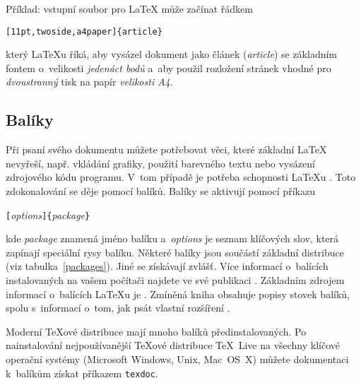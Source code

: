\begin{table}[!bp]
\begin{lined}{\textwidth}
\begin{flushleft}
\begin{description}
\end{description}
\end{flushleft}
\end{lined}
\end{table}

Příklad: vstupní soubor pro \LaTeX{} může začínat řádkem
\begin{code}
\verb|[11pt,twoside,a4paper]{article}|
\end{code}
který \LaTeX u říká, aby vysázel dokument jako článek (\emph{article})
se základním fontem o~velikosti \emph{jedenáct bodů} a~aby použil
rozložení stránek vhodné pro \emph{dvoustranný} tisk na papír
\emph{velikosti A4}.
\pagebreak[2]

\subsection{Balíky}
Při psaní svého dokumentu můžete potřebovat věci, které
základní \LaTeX{} nevyřeší, např. vkládání
grafiky, použití barevného textu nebo vysázení zdrojového kódu
programu. V~tom případě je potřeba schopnosti \LaTeX u .
Toto zdokonalování se děje
pomocí balíků. Balíky se aktivují pomocí příkazu
\begin{lscommand}
\verb|[|\emph{options}\verb|]{|\emph{package}\verb|}|
\end{lscommand}
\noindent kde \emph{package} znamená jméno balíku a~\emph{options}
je seznam klíčových slov, která zapínají speciální rysy balíku.
Některé balíky jsou součástí základní distribuce \LaTeXe{}
(viz tabulka~\ref{packages}). Jiné se získávají zvlášť. Více informací
o~balících instalovaných na vašem počítači najdete ve své publikaci \guide.
Základním zdrojem informací o~balících \LaTeX u je \companion.
Zmíněná kniha obsahuje popisy stovek balíků, spolu s~informací o~tom,
jak psát vlastní rozšíření \LaTeXe.

Moderní \TeX ové distribuce mají mnoho balíků předinstalovaných.
Po nainstalování nejpoužívanější \TeX ové distribuce \TeX~Live na všechny klíčové operační systémy (Microsoft Windows, Unix, Mac~OS~X)
můžete dokumentaci k~balíkům získat příkazem
\texttt{texdoc}.

